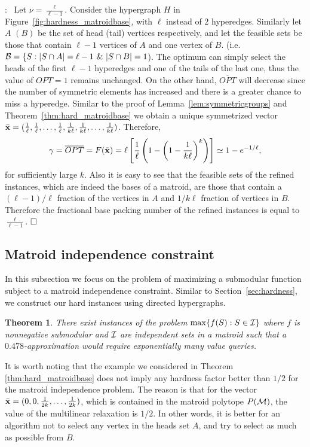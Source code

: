 \documentclass{article}[11pt]
\newtheorem{theorem}{Theorem}[section]
\renewenvironment{proof}{\noindent{\bf Proof}:~}{$\hfill \Box$\\}
\def\bx{{\bf x}}
\def\cM{{\cal M}}
\def\cI{{\cal I}}
\def\cB{{\cal B}}
\def\max{{\rm{max}}}
\begin{document}
\begin{proof}
Let $\nu=\frac{\ell}{\ell-1}$.
Consider the hypergraph $H$ in Figure~\ref{fig:hardness_matroidbase},
with $\ell$ instead of $2$ hyperedges. Similarly let $A$ $(B)$ be the set of head (tail) vertices
respectively, and let the feasible sets be those that contain $\ell-1$ vertices of $A$ and
one vertex of $B$. (i.e. $\cB=\{S: |S\cap A|=\ell-1~\&~|S\cap B| = 1$).
The optimum can simply select the heads of the first $\ell-1$ hyperedges
and one of the tails of the last one, thus the value of $OPT=1$ remains unchanged.
On the other hand, $\overline{OPT}$ will decrease since the number of symmetric elements
has increased and there is a greater chance to miss a hyperedge.
Similar to the proof of Lemma~\ref{lem:symmetricgroups} and
Theorem~\ref{thm:hard_matroidbase} we obtain a unique symmetrized
vector $\bar{\bx}=(\frac1\ell,\frac1\ell,\ldots,\frac1\ell,
\frac{1}{k\ell},\frac{1}{k\ell},\ldots,\frac{1}{k\ell})$. Therefore,
$$
\gamma=\overline{OPT}=F(\bar{\bx})= \ell \left[ \frac{1}{\ell}
\left(1-\left(1-\frac{1}{k\ell}\right)^k\right)\right]
 \simeq 1-e^{-1/\ell},
$$
for sufficiently large $k$. Also it is easy to see that the feasible sets
of the refined instances, which are indeed the bases of a matroid,
are those that contain a $(\ell-1)/\ell$ fraction of the vertices in $A$
and $1/k\ell$ fraction of vertices in $B$. Therefore the fractional base packing number
of the refined instances is equal to $\frac{\ell}{\ell-1}$.
\end{proof}


\subsection{Matroid independence constraint}
\label{subsec:matroidindependence}

In this subsection we focus on the problem of maximizing a submodular
function subject to a matroid independence constraint.
Similar to Section~\ref{sec:hardness},
we construct our hard instances using directed hypergraphs.

\begin{theorem}
\label{thm:hard_matroidindependence}
There exist instances of the problem $\max\{f(S):S \in \mathcal{I}\}$
where $f$ is nonnegative submodular and $\cI$ are independent sets in a matroid
such that a $0.478$-approximation would require exponentially many value queries.
\end{theorem}

It is worth noting that the example we considered in Theorem \ref{thm:hard_matroidbase}
does not imply any hardness factor better than $1/2$ for the matroid independence problem.
The reason is that for the vector $\bar{\bx}=(0,0,\frac{1}{2k},\ldots,\frac{1}{2k})$, which is contained
in the matroid polytope $P(\cM)$, the value of the multilinear relaxation is $1/2$.
In other words, it is better for an algorithm not to select any vertex in the heads set $A$,
and try to select as much as possible from $B$. 
\end{document}
